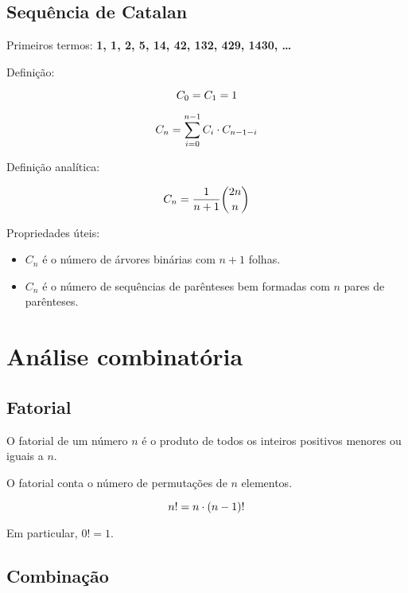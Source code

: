 \documentclass[10pt, a4paper, oneside]{book}
\begin{document}
\subsection{Sequência de Catalan}

Primeiros termos: \textbf{1, 1, 2, 5, 14, 42, 132, 429, 1430, \ldots}

Definição:

\begin{equation*}
\large
C_0 = C_1 = 1
\end{equation*}

\begin{equation*}
\large
C_n = \sum_{i=0}^{n-1} C_i \cdot C_{n-1-i}
\end{equation*}

Definição analítica:

\begin{equation*}
\large
C_n = \frac{1}{n+1} \binom{2n}{n}
\end{equation*}

Propriedades úteis:

\begin{itemize}
  \item $C_n$ é o número de árvores binárias com $n+1$ folhas.
  \item $C_n$ é o número de sequências de parênteses bem formadas com $n$ pares de parênteses.
\end{itemize}

\section{Análise combinatória}

\subsection{Fatorial}

O fatorial de um número $n$ é o produto de todos os inteiros positivos menores ou iguais a $n$.

O fatorial conta o número de permutações de $n$ elementos.

\begin{equation*}
\large
n! = n \cdot (n-1)!
\end{equation*}

Em particular, $0! = 1$.

\subsection{Combinação}
\end{document}
